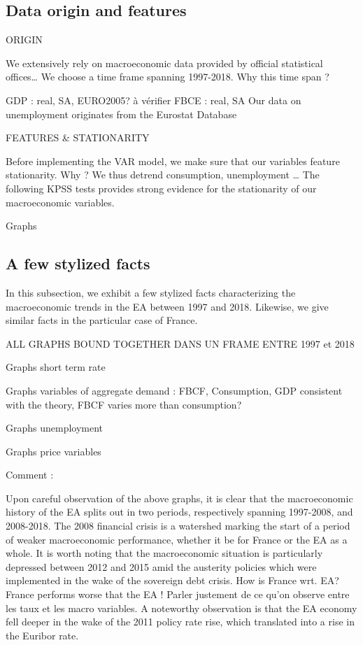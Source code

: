 \documentclass[
  10pt,
]{article}
\begin{document}
\hypertarget{data-origin-and-features}{%
\subsection*{Data origin and features}\label{data-origin-and-features}}

ORIGIN

We extensively rely on macroeconomic data provided by official statistical offices\ldots{} We choose a time frame spanning 1997-2018. Why this time span ?

GDP : real, SA, EURO2005? à vérifier
FBCE : real, SA
Our data on unemployment originates from the Eurostat Database

FEATURES \& STATIONARITY

Before implementing the VAR model, we make sure that our variables feature stationarity. Why ? We thus detrend consumption, unemployment \ldots{} The following KPSS tests provides strong evidence for the stationarity of our macroeconomic variables.

Graphs

\hypertarget{a-few-stylized-facts}{%
\subsection*{A few stylized facts}\label{a-few-stylized-facts}}

In this subsection, we exhibit a few stylized facts characterizing the macroeconomic trends in the EA between 1997 and 2018. Likewise, we give similar facts in the particular case of France.

ALL GRAPHS BOUND TOGETHER DANS UN FRAME ENTRE 1997 et 2018

Graphs short term rate

Graphs variables of aggregate demand : FBCF, Consumption, GDP
consistent with the theory, FBCF varies more than consumption?

Graphs unemployment

Graphs price variables

Comment :

Upon careful observation of the above graphs, it is clear that the macroeconomic history of the EA splits out in two periods, respectively spanning 1997-2008, and 2008-2018. The 2008 financial crisis is a watershed marking the start of a period of weaker macroeconomic performance, whether it be for France or the EA as a whole. It is worth noting that the macroeconomic situation is particularly depressed between 2012 and 2015 amid the austerity policies which were implemented in the wake of the sovereign debt crisis. How is France wrt. EA? France performs worse that the EA ! Parler justement de ce qu'on observe entre les taux et les macro variables. A noteworthy observation is that the EA economy fell deeper in the wake of the 2011 policy rate rise, which translated into a rise in the Euribor rate.
\end{document}
